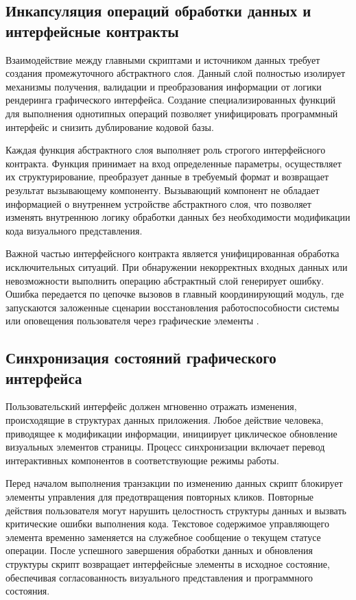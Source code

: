\documentclass[bachelor, och, pract, times]{SCWorks}
\begin{document}
\subsection{Инкапсуляция операций обработки данных и интерфейсные контракты}
Взаимодействие между главными скриптами и источником данных требует создания
промежуточного абстрактного слоя. Данный слой полностью изолирует механизмы
получения, валидации и преобразования информации от логики рендеринга
графического интерфейса. Создание специализированных функций для выполнения
однотипных операций позволяет унифицировать программный интерфейс и снизить
дублирование кодовой базы.

Каждая функция абстрактного слоя выполняет роль строгого интерфейсного
контракта. Функция принимает на вход определенные параметры, осуществляет их
структурирование, преобразует данные в требуемый формат и возвращает результат
вызывающему компоненту. Вызывающий компонент не обладает информацией о
внутреннем устройстве абстрактного слоя, что позволяет изменять внутреннюю
логику обработки данных без необходимости модификации кода визуального
представления.

Важной частью интерфейсного контракта является унифицированная обработка
исключительных ситуаций. При обнаружении некорректных входных данных или
невозможности выполнить операцию абстрактный слой генерирует ошибку. Ошибка
передается по цепочке вызовов в главный координирующий модуль, где запускаются
заложенные сценарии восстановления работоспособности системы или оповещения
пользователя через графические элементы \cite{mdn_fetch}.

\subsection{Синхронизация состояний графического интерфейса}
Пользовательский интерфейс должен мгновенно отражать изменения, происходящие в
структурах данных приложения. Любое действие человека, приводящее к модификации
информации, инициирует циклическое обновление визуальных элементов страницы.
Процесс синхронизации включает перевод интерактивных компонентов в
соответствующие режимы работы.

Перед началом выполнения транзакции по изменению данных скрипт блокирует
элементы управления для предотвращения повторных кликов. Повторные действия
пользователя могут нарушить целостность структуры данных и вызвать критические
ошибки выполнения кода. Текстовое содержимое управляющего элемента временно
заменяется на служебное сообщение о текущем статусе операции. После успешного
завершения обработки данных и обновления структуры скрипт возвращает
интерфейсные элементы в исходное состояние, обеспечивая согласованность
визуального представления и программного состояния.
\end{document}
